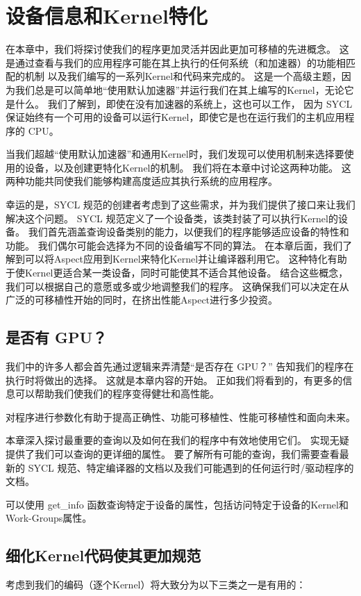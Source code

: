 \section{设备信息和Kernel特化}
在本章中，我们将探讨使我们的程序更加灵活并因此更加可移植的先进概念。 
这是通过查看与我们的应用程序可能在其上执行的任何系统（和加速器）的功能相匹配的机制
以及我们编写的一系列Kernel和代码来完成的。 
这是一个高级主题，因为我们总是可以简单地“使用默认加速器”并运行我们在其上编写的Kernel，无论它是什么。 
我们了解到，即使在没有加速器的系统上，这也可以工作，
因为 SYCL 保证始终有一个可用的设备可以运行Kernel，即使它是也在运行我们的主机应用程序的 CPU。

当我们超越“使用默认加速器”和通用Kernel时，我们发现可以使用机制来选择要使用的设备，以及创建更特化Kernel的机制。 
我们将在本章中讨论这两种功能。 这两种功能共同使我们能够构建高度适应其执行系统的应用程序。

幸运的是，SYCL 规范的创建者考虑到了这些需求，并为我们提供了接口来让我们解决这个问题。 
SYCL 规范定义了一个设备类，该类封装了可以执行Kernel的设备。 
我们首先涵盖查询设备类别的能力，以便我们的程序能够适应设备的特性和功能。 
我们偶尔可能会选择为不同的设备编写不同的算法。 
在本章后面，我们了解到可以将Aspect应用到Kernel来特化Kernel并让编译器利用它。 
这种特化有助于使Kernel更适合某一类设备，同时可能使其不适合其他设备。 
结合这些概念，我们可以根据自己的意愿或多或少地调整我们的程序。 
这确保我们可以决定在从广泛的可移植性开始的同时，在挤出性能Aspect进行多少投资。

\subsection{是否有 GPU？}
我们中的许多人都会首先通过逻辑来弄清楚“是否存在 GPU？” 告知我们的程序在执行时将做出的选择。 
这就是本章内容的开始。 正如我们将看到的，有更多的信息可以帮助我们使我们的程序变得健壮和高性能。

\begin{remark}
	对程序进行参数化有助于提高正确性、功能可移植性、性能可移植性和面向未来。
\end{remark}

本章深入探讨最重要的查询以及如何在我们的程序中有效地使用它们。 实现无疑提供了我们可以查询的更详细的属性。 
要了解所有可能的查询，我们需要查看最新的 SYCL 规范、特定编译器的文档以及我们可能遇到的任何运行时/驱动程序的文档。

可以使用 get\_info 函数查询特定于设备的属性，包括访问特定于设备的Kernel和Work-Groups属性。

\subsection{细化Kernel代码使其更加规范}
考虑到我们的编码（逐个Kernel）将大致分为以下三类之一是有用的：


